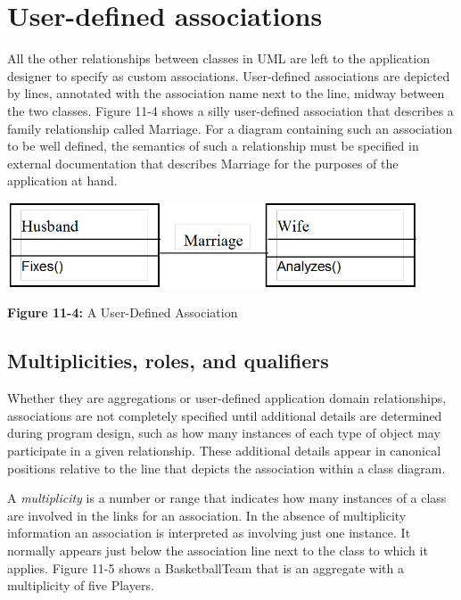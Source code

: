 \section{User-defined associations}

All the other relationships between classes in UML are left
to the application designer to specify as custom associations.
User-defined associations are depicted by lines, annotated with the
association name next to the line, midway between the two classes.
Figure 11-4 shows a silly user-defined association that describes a
family relationship called Marriage. For a diagram containing such an
association to be well defined, the semantics of such a relationship
must be specified in external documentation that describes Marriage for
the purposes of the application at hand.

\begin{center}
\includegraphics[width=4.8in,height=1.0in]{ub-img/marriage.png} 

{\sffamily\bfseries Figure 11-4:}
{\sffamily A User-Defined Association}
\end{center}

\subsection*{Multiplicities, roles, and qualifiers}

Whether they are aggregations or user-defined application domain
relationships, associations are not completely specified until
additional details are determined during program design, such as how
many instances of each type of object may participate in a given
relationship. These additional details appear in canonical positions
relative to the line that depicts the association within a class
diagram.

A \textit{multiplicity} is a number or range that
indicates how many instances of a class are involved in the links for
an association. In the absence of multiplicity information an
association is interpreted as involving just one instance. It normally
appears just below the association line next to the class to which it
applies. Figure 11-5 shows a BasketballTeam that is an aggregate with a
multiplicity of five Players.

